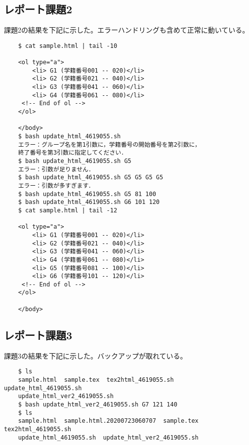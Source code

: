 \documentclass[12pt]{jarticle}
\begin{document}
\subsection{レポート課題2}
課題2の結果を下記に示した。エラーハンドリングも含めて正常に動いている。
\begin{lstlisting}
    $ cat sample.html | tail -10

    <ol type="a">
        <li> G1 (学籍番号001 -- 020)</li>
        <li> G2 (学籍番号021 -- 040)</li>
        <li> G3 (学籍番号041 -- 060)</li>
        <li> G4 (学籍番号061 -- 080)</li>
     <!-- End of ol -->
    </ol>

    </body>
    $ bash update_html_4619055.sh
    エラー：グループ名を第1引数に，学籍番号の開始番号を第2引数に，
    終了番号を第3引数に指定してください．
    $ bash update_html_4619055.sh G5
    エラー：引数が足りません．
    $ bash update_html_4619055.sh G5 G5 G5 G5
    エラー：引数が多すぎます．
    $ bash update_html_4619055.sh G5 81 100
    $ bash update_html_4619055.sh G6 101 120
    $ cat sample.html | tail -12

    <ol type="a">
        <li> G1 (学籍番号001 -- 020)</li>
        <li> G2 (学籍番号021 -- 040)</li>
        <li> G3 (学籍番号041 -- 060)</li>
        <li> G4 (学籍番号061 -- 080)</li>
        <li> G5 (学籍番号081 -- 100)</li>
        <li> G6 (学籍番号101 -- 120)</li>
     <!-- End of ol -->
    </ol>

    </body>
\end{lstlisting}
\subsection{レポート課題3}
課題3の結果を下記に示した。バックアップが取れている。
\begin{lstlisting}
    $ ls
    sample.html  sample.tex  tex2html_4619055.sh  update_html_4619055.sh  
    update_html_ver2_4619055.sh
    $ bash update_html_ver2_4619055.sh G7 121 140
    $ ls 
    sample.html  sample.html.20200723060707  sample.tex  tex2html_4619055.sh  
    update_html_4619055.sh  update_html_ver2_4619055.sh
\end{lstlisting}
\end{document}
